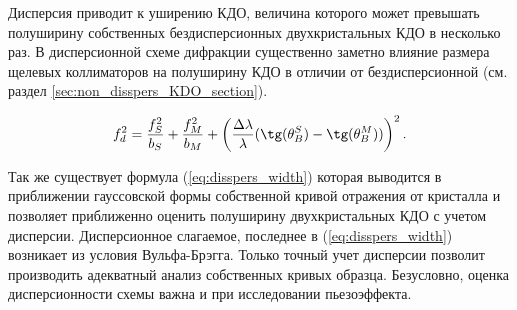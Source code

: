Дисперсия приводит к уширению КДО, величина которого может превышать полуширину собственных бездисперсионных
двухкристальных КДО в несколько раз. В дисперсионной схеме дифракции существенно заметно
влияние размера щелевых коллиматоров на полуширину КДО в отличии от бездисперсионной (см. раздел \ref{sec:non_disspers_KDO_section}).

\begin{equation}
 f_d^2 = \frac{f_S^2}{b_S}+\frac{f_M^2}{b_M}+\left( \frac{\Delta \lambda}{\lambda} (\tg(\theta_B^S) - \tg(\theta_B^M)) \right)^2.
 \label{eq:disspers_width}
\end{equation}

Так же существует формула (\ref{eq:disspers_width}) \cite{lider2009} которая выводится в приближении
гауссовской формы собственной кривой отражения от кристалла и позволяет приближенно оценить
 полуширину двухкристальных КДО с учетом дисперсии. Дисперсионное слагаемое, последнее в (\ref{eq:disspers_width})
 возникает из условия Вульфа-Брэгга. Только точный учет дисперсии позволит производить адекватный анализ собственных кривых образца.
 Безусловно, оценка дисперсионности схемы важна и при исследовании пьезоэффекта.
